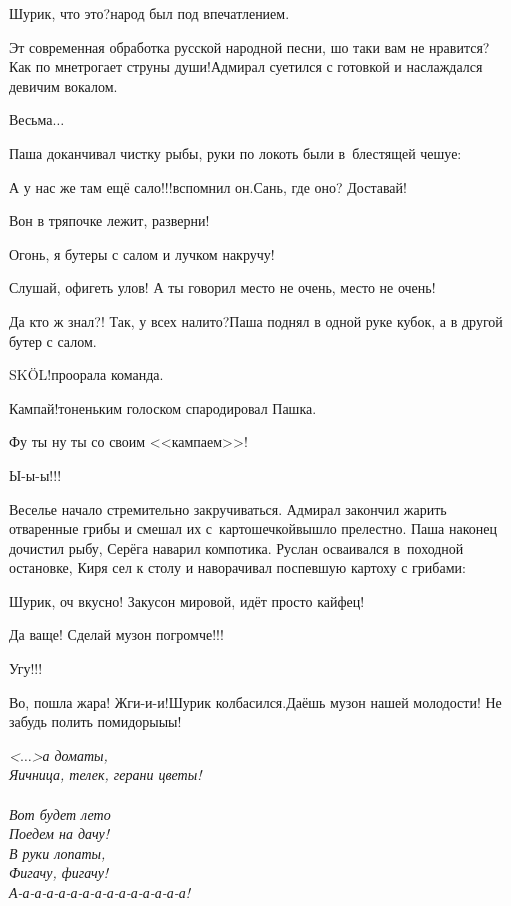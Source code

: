 \diagdash Шурик, что это?\mdash народ был под впечатлением.

\diagdash Эт современная обработка русской народной песни, шо таки вам не нравится? Как по мне\mdash трогает струны души!\mdash Адмирал суетился с готовкой и наслаждался девичим вокалом.

\diagdash Весьма$\ldots$

Паша доканчивал чистку рыбы, руки по локоть были в~блестящей чешуе:

\diagdash А у нас же там ещё сало!!!\mdash вспомнил он.\mdash Сань, где оно? Доставай!

\diagdash Вон в тряпочке лежит, разверни!

\diagdash Огонь, я бутеры с салом и лучком накручу!

\diagdash Слушай, офигеть улов! А ты говорил место не очень, место не очень!

\diagdash Да кто ж знал?! Так, у всех налито?\mdash Паша поднял в одной руке кубок, а в другой бутер с салом.

\diagdash SK{\"O}L!\mdash проорала команда.

\diagdash Кампай!\mdash тоненьким голоском спародировал Пашка.

\diagdash Фу ты ну ты со своим <<кампаем>>!

\diagdash Ы-ы-ы!!!

Веселье начало стремительно закручиваться. Адмирал закончил жарить отваренные грибы и смешал их с~картошечкой\mdash вышло прелестно. Паша наконец дочистил рыбу, Серёга наварил компотика. Руслан осваивался в~походной остановке, Киря сел к столу и наворачивал поспевшую картоху с грибами:

\diagdash Шурик, оч вкусно! Закусон мировой, идёт просто кайфец!

\diagdash Да ваще! Сделай музон погромче!!!

\diagdash Угу!!!

\diagdash Во, пошла жара! Жги-и-и!\mdash Шурик колбасился.\mdash Даёшь музон нашей молодости! Не забудь полить помидоры\sdash ы\sdash ы!

\vspace{0.2cm}
\noindent\textit{%
	\hspace*{3.4cm}<$\ldots$>а дома\mdash ты,\\
	\hspace*{3.4cm}Яичница, телек, герани цветы!\\
	\\
	\hspace*{3.4cm}Вот будет лето\mdash\\
	\hspace*{3.4cm}Поедем на дачу!\\
	\hspace*{3.4cm}В руки лопаты,\\
	\hspace*{3.4cm}Фигачу, фигачу!\\	
	\hspace*{3.4cm}А-а-а-а-а-а-а-а-а-а-а-а-а-а-а!\mdash	
}
\vspace{0.2cm}


